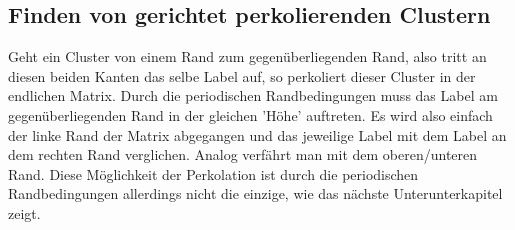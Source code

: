 \documentclass[a4paper, 12pt]{report}
\begin{document}
\clearpage
\subsection{Finden von gerichtet perkolierenden Clustern \label{gerichtet}}
Geht ein Cluster von einem Rand zum gegenüberliegenden Rand, also tritt an diesen beiden Kanten das selbe Label auf, so perkoliert dieser Cluster in der endlichen Matrix. Durch die periodischen Randbedingungen muss das Label am gegenüberliegenden Rand in der gleichen 'Höhe' auftreten. Es wird also einfach der linke Rand der Matrix abgegangen und das jeweilige Label mit dem Label an dem rechten Rand verglichen. Analog verfährt man mit dem oberen/unteren Rand. Diese Möglichkeit der Perkolation ist durch die periodischen Randbedingungen allerdings nicht die einzige, wie das nächste Unterunterkapitel zeigt.
\end{document}
